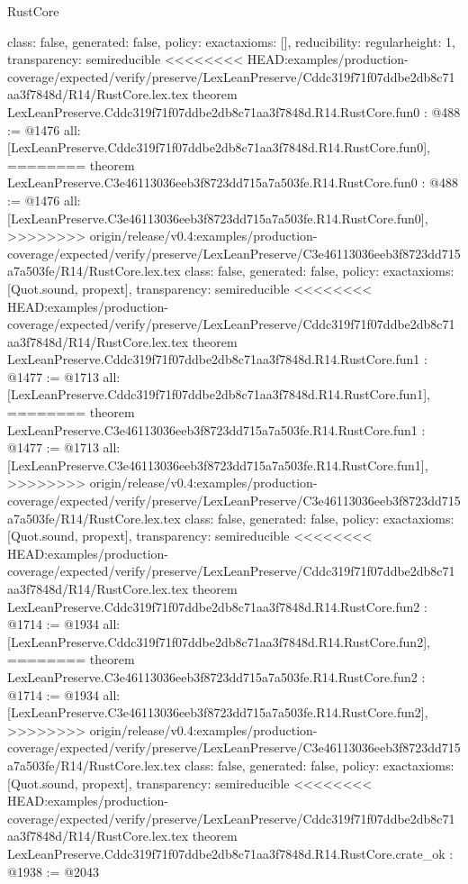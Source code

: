 \begin{lexlean}{RustCore}
\begin{coremodule}
{\begin{coremodule}
{{{  class: false,
  generated: false,
  policy: exact{axioms: []},
  reducibility: regular{height: 1},
  transparency: semireducible
}
<<<<<<<< HEAD:examples/production-coverage/expected/verify/preserve/LexLeanPreserve/Cddc319f71f07ddbe2db8c71aa3f7848d/R14/RustCore.lex.tex
theorem LexLeanPreserve.Cddc319f71f07ddbe2db8c71aa3f7848d.R14.RustCore.fun0 : @488 := @1476 {
  all: [LexLeanPreserve.Cddc319f71f07ddbe2db8c71aa3f7848d.R14.RustCore.fun0],
========
theorem LexLeanPreserve.C3e46113036eeb3f8723dd715a7a503fe.R14.RustCore.fun0 : @488 := @1476 {
  all: [LexLeanPreserve.C3e46113036eeb3f8723dd715a7a503fe.R14.RustCore.fun0],
>>>>>>>> origin/release/v0.4:examples/production-coverage/expected/verify/preserve/LexLeanPreserve/C3e46113036eeb3f8723dd715a7a503fe/R14/RustCore.lex.tex
  class: false,
  generated: false,
  policy: exact{axioms: [Quot.sound, propext]},
  transparency: semireducible
}
<<<<<<<< HEAD:examples/production-coverage/expected/verify/preserve/LexLeanPreserve/Cddc319f71f07ddbe2db8c71aa3f7848d/R14/RustCore.lex.tex
theorem LexLeanPreserve.Cddc319f71f07ddbe2db8c71aa3f7848d.R14.RustCore.fun1 : @1477 := @1713 {
  all: [LexLeanPreserve.Cddc319f71f07ddbe2db8c71aa3f7848d.R14.RustCore.fun1],
========
theorem LexLeanPreserve.C3e46113036eeb3f8723dd715a7a503fe.R14.RustCore.fun1 : @1477 := @1713 {
  all: [LexLeanPreserve.C3e46113036eeb3f8723dd715a7a503fe.R14.RustCore.fun1],
>>>>>>>> origin/release/v0.4:examples/production-coverage/expected/verify/preserve/LexLeanPreserve/C3e46113036eeb3f8723dd715a7a503fe/R14/RustCore.lex.tex
  class: false,
  generated: false,
  policy: exact{axioms: [Quot.sound, propext]},
  transparency: semireducible
}
<<<<<<<< HEAD:examples/production-coverage/expected/verify/preserve/LexLeanPreserve/Cddc319f71f07ddbe2db8c71aa3f7848d/R14/RustCore.lex.tex
theorem LexLeanPreserve.Cddc319f71f07ddbe2db8c71aa3f7848d.R14.RustCore.fun2 : @1714 := @1934 {
  all: [LexLeanPreserve.Cddc319f71f07ddbe2db8c71aa3f7848d.R14.RustCore.fun2],
========
theorem LexLeanPreserve.C3e46113036eeb3f8723dd715a7a503fe.R14.RustCore.fun2 : @1714 := @1934 {
  all: [LexLeanPreserve.C3e46113036eeb3f8723dd715a7a503fe.R14.RustCore.fun2],
>>>>>>>> origin/release/v0.4:examples/production-coverage/expected/verify/preserve/LexLeanPreserve/C3e46113036eeb3f8723dd715a7a503fe/R14/RustCore.lex.tex
  class: false,
  generated: false,
  policy: exact{axioms: [Quot.sound, propext]},
  transparency: semireducible
}
<<<<<<<< HEAD:examples/production-coverage/expected/verify/preserve/LexLeanPreserve/Cddc319f71f07ddbe2db8c71aa3f7848d/R14/RustCore.lex.tex
theorem LexLeanPreserve.Cddc319f71f07ddbe2db8c71aa3f7848d.R14.RustCore.crate_ok : @1938 := @2043 {
}}}}}}
\end{coremodule}}
\end{coremodule}
\end{lexlean}
